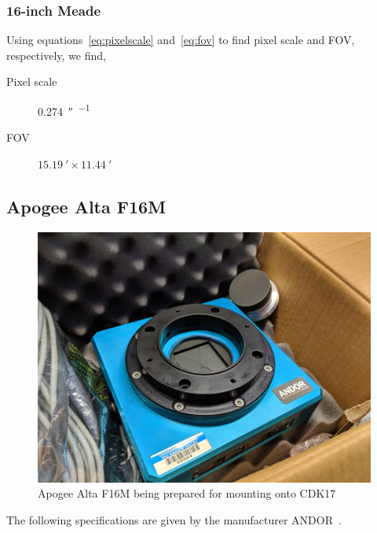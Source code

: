 \subsubsection{16-inch Meade}
Using equations~\ref{eq:pixelscale} and~\ref{eq:fov} to find pixel scale and FOV, respectively, we find, 
\begin{description}
    \item[Pixel scale] \SI{0.274}{\arcsecond\per{}}
    \item[FOV] $\SI{15.19}{\arcminute} \times \SI{11.44}{\arcminute}$
\end{description}

\subsection{Apogee Alta F16M}
\begin{figure}[h]
    \centering
    \includegraphics[width=0.5\columnwidth]{figures/apogee.jpg}
    \caption{Apogee Alta F16M being prepared for mounting onto CDK17}
\label{fig:apogee}
\end{figure}

The following specifications are given by the manufacturer ANDOR~\cite{apogee}.

